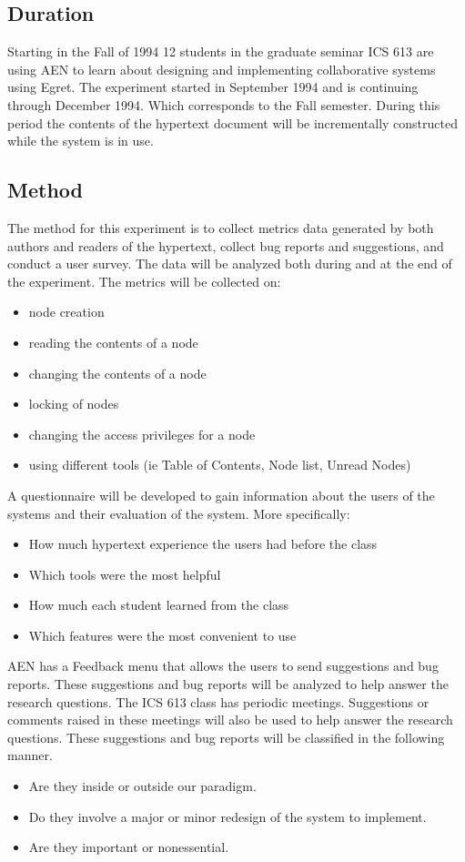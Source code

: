 \subsection{Duration}
Starting in the Fall of 1994 12 students in the graduate seminar ICS 613
are using AEN to learn about designing and implementing collaborative
systems using Egret.  The experiment started in September 1994 and is
continuing through December 1994.  Which corresponds to the Fall semester.
During this period the contents of the hypertext document will be
incrementally constructed while the system is in use.

\subsection{Method}

The method for this experiment is to collect metrics data generated by both
authors and readers of the hypertext, collect bug reports and suggestions,
and conduct a user survey.  The data will be analyzed both during and at
the end of the experiment.  The metrics will be collected
on:\begin{itemize}
\item{node creation}
\item{reading the contents of a node}
\item{changing the contents of a node}
\item{locking of nodes}
\item{changing the access privileges for a node}
\item{using different tools (ie Table of Contents, Node list, Unread
  Nodes)}
\end{itemize}

A questionnaire will be developed to gain information about the users of the
systems and their evaluation of the system.  More
specifically:\begin{itemize}
\item{How much hypertext experience the users had before the class}
\item{Which tools were the most helpful}
\item{How much each student learned from the class}
\item{Which features were the most convenient to use}
\end{itemize}

AEN has a Feedback menu that allows the users to send suggestions and bug
reports.  These suggestions and bug reports will be analyzed to help answer
the research questions.  The ICS 613 class has periodic meetings.
Suggestions or comments raised in these meetings will also be used to help
answer the research questions.  These suggestions and bug reports will be
classified in the following manner.\begin{itemize}
\item{Are they inside or outside our paradigm.}
\item{Do they involve a major or minor redesign of the system to
implement.}
\item{Are they important or nonessential.}
\end{itemize}

